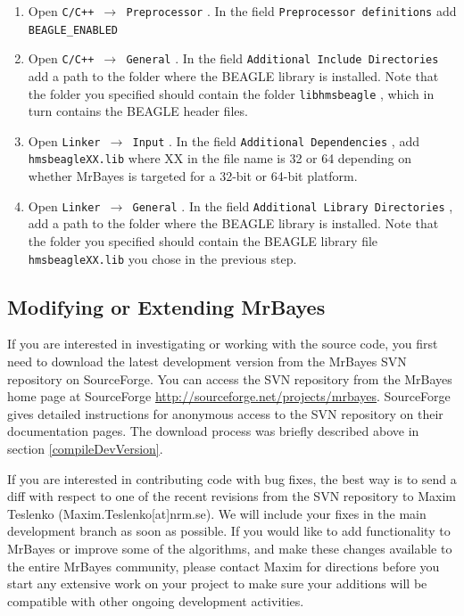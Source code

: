 \documentclass[12pt]{book}
\newcommand{\ttt}[1]{\texttt{#1} }
\begin{document}
\begin{enumerate}
\item Open \ttt{C/C++  $\rightarrow$ Preprocessor}. In the field \ttt{Preprocessor definitions} add 
\ttt{BEAGLE\_ENABLED}
\item Open \ttt{C/C++  $\rightarrow$ General}. In the field \ttt{Additional Include Directories} add a path 
to the folder where the BEAGLE library is installed. Note that the folder you specified should contain the folder 
\ttt{libhmsbeagle}, which in turn contains the  BEAGLE header files. 
\item Open \ttt{Linker  $\rightarrow$ Input}. In the field \ttt{Additional Dependencies}, add 
\ttt{hmsbeagleXX.lib} where XX in the file name is 32 or 64 depending on whether MrBayes is targeted for 
a 32-bit or 64-bit platform.
\item Open \ttt{Linker  $\rightarrow$ General}. In the field \ttt{Additional Library Directories}, add a path 
to the folder where the BEAGLE library is installed. Note that the folder you specified should contain the
BEAGLE library file \ttt{hmsbeagleXX.lib} you chose in the previous step.
\end{enumerate}

\subsection{Modifying or Extending MrBayes}

If you are interested in investigating or working with the source 
code, you first need to download the latest development version from the MrBayes SVN
repository on SourceForge. You can access
the SVN repository from the MrBayes home page at SourceForge \url{http://sourceforge.net/projects/mrbayes}.
SourceForge gives detailed instructions for anonymous access to the SVN repository on their documentation pages. The download process was briefly described above in section \ref{compileDevVersion}.

If you are interested in contributing code with bug fixes, the best way is to send a diff with respect to 
one of the recent revisions from the SVN repository to Maxim Teslenko (Maxim.Teslenko[at]nrm.se).
We will include your fixes in the main development branch as soon as possible. If you would like to add
functionality to MrBayes or improve some of the algorithms, and make these changes available to the entire MrBayes community, please contact Maxim for directions before you start any extensive work 
on your project to make sure your additions will be compatible with other ongoing development activities.
\end{document}
